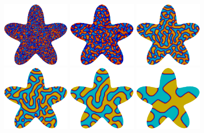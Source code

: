 \documentclass[11pt]{article}
\begin{document}
\begin{titlepage}
\begin{center}
        \begin{figure}[H]
            \centering
            \includegraphics[width=0.3\textwidth]{results/illustration/f0.png}
            \includegraphics[width=0.3\textwidth]{results/illustration/f10.png}
            \includegraphics[width=0.3\textwidth]{results/illustration/f50.png}
            \vspace{10pt}
            \includegraphics[width=0.3\textwidth]{results/illustration/f200.png}
            \includegraphics[width=0.3\textwidth]{results/illustration/f1000.png}
            \includegraphics[width=0.3\textwidth]{results/illustration/f10000.png}

\end{figure}
\end{center}
\end{titlepage}
\end{document}
